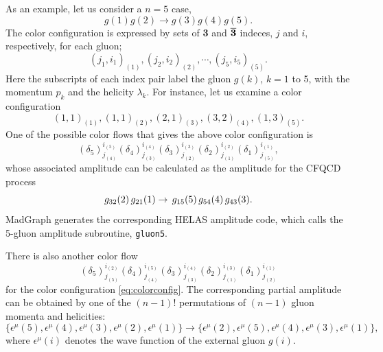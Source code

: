 \documentclass[a4paper,11pt]{article}
\begin{document}
As an example, let us consider a $n=5$ case,
\begin{equation}
g(1)g(2)\rightarrow g(3)g(4)g(5).
\end{equation}
 The color configuration is expressed by sets of {\bf 3} and
$\overline{\bf 3}$ indeces, $j$ and $i$, respectively, for each gluon;
\begin{equation}
(j_1,i_1)_{(1)}, (j_2,i_2)_{(2)}, \cdots, (j_5,i_5)_{(5)}.
\end{equation}
Here the subscripts of each index pair label the gluon $g(k)$, $k=1$ to 5,
with the momentum $p_k$ and the helicity $\lambda_k$. For instance, let us
examine a color
configuration
\begin{equation}
(1,1)_{(1)}, (1,1)_{(2)},(2,1)_{(3)},(3,2)_{(4)},(1,3)_{(5)}.
\label{eq:colorconfig}
\end{equation}
  One of the possible color flows that gives the above color
  configuration is
\begin{equation}
(\delta_5)^{i_{(5)}}_{j_{(4)}}(\delta_4)^{i_{(4)}}_{j_{(3)}}(\delta_3)^{i_{(3)}}_{j_{(2)}}(\delta_2)^{i_{(2)}}_{j_{(1)}}(\delta_1)^{i_{(1)}}_{j_{(5)}},
\label{eq:cf1}
\end{equation}
 whose associated amplitude can be calculated as the amplitude for the
 CFQCD process\\
\begin{equation}
 g_{32}(2)\,g_{21}(1)\rightarrow \,g_{15}(5) \,g_{54}(4) \,g_{43}(3). \\
\end{equation}
MadGraph generates the corresponding HELAS amplitude code, which calls the
5-gluon amplitude subroutine, {\tt gluon5}.

There is also another color flow
\begin{equation}
(\delta_5)^{i_{(2)}}_{j_{(5)}}(\delta_4)^{i_{(5)}}_{j_{(4)}}(\delta_3)^{i_{(4)}}_{j_{(3)}}(\delta_2)^{i_{(3)}}_{j_{(1)}}(\delta_1)^{i_{(1)}}_{j_{(2)}}
\label{eq:cf2}
\end{equation}
for the color configuration \eqref{eq:colorconfig}. The corresponding partial
amplitude can be obtained by one of the $(n-1)!$ permutations of $(n-1)$ gluon momenta and
helicities:
\begin{equation}
\bigl\{\epsilon^{\mu}(5),\epsilon^{\mu}(4),\epsilon^{\mu}(3),\epsilon^{\mu}(2),\epsilon^{\mu}(1)\bigr\}\rightarrow
\bigl\{\epsilon^{\mu}(2),\epsilon^{\mu}(5),\epsilon^{\mu}(4),\epsilon^{\mu}(3),\epsilon^{\mu}(1)\bigr\},
\end{equation}
where $\epsilon^{\mu}(i)$ denotes the wave function of the external
 gluon $g(i)$.
\end{document}

